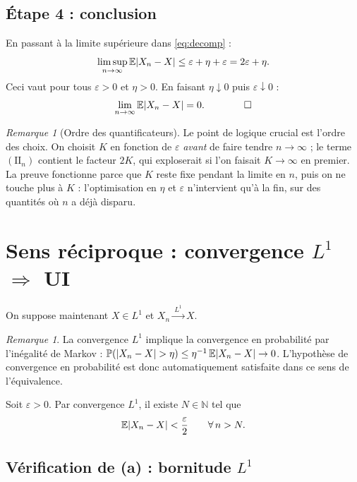 \documentclass[11pt,a4paper]{article}
\theoremstyle{definition}
\theoremstyle{remark}
\newtheorem{remark}[theorem]{Remarque}
\newcommand{\E}{\mathbb{E}}
\newcommand{\PP}{\mathbb{P}}
\newcommand{\N}{\mathbb{N}}
\newcommand{\convLone}{\xrightarrow{\ L^1\ }}
\DeclarePairedDelimiter{\abs}{\lvert}{\rvert}
\begin{document}
\subsection{Étape 4 : conclusion}

En passant à la limite supérieure dans \eqref{eq:decomp} :
\[
\limsup_{n \to \infty} \E\abs{X_n - X}
\le \varepsilon + \eta + \varepsilon
= 2\varepsilon + \eta.
\]
Ceci vaut pour tous $\varepsilon > 0$ et $\eta > 0$. En faisant
$\eta \downarrow 0$ puis $\varepsilon \downarrow 0$ :
\[
\lim_{n \to \infty} \E\abs{X_n - X} = 0. \qquad \qed
\]

\begin{remark}[Ordre des quantificateurs]
Le point de logique crucial est l'ordre des choix. On choisit $K$ en fonction de
$\varepsilon$ \emph{avant} de faire tendre $n \to \infty$ ; le terme
$(\mathrm{II}_n)$ contient le facteur $2K$, qui exploserait si l'on faisait
$K \to \infty$ en premier. La preuve fonctionne parce que $K$ reste fixe pendant
la limite en $n$, puis on ne touche plus à $K$ : l'optimisation en $\eta$ et
$\varepsilon$ n'intervient qu'à la fin, sur des quantités où $n$ a déjà disparu.
\end{remark}

\section{Sens réciproque : convergence $L^1$ $\Rightarrow$ UI}

On suppose maintenant $X \in L^1$ et $X_n \convLone X$.

\begin{remark}
La convergence $L^1$ implique la convergence en probabilité par l'inégalité de
Markov : $\PP(\abs{X_n - X} > \eta) \le \eta^{-1}\,\E\abs{X_n - X} \to 0$.
L'hypothèse de convergence en probabilité est donc automatiquement satisfaite
dans ce sens de l'équivalence.
\end{remark}

Soit $\varepsilon > 0$. Par convergence $L^1$, il existe $N \in \N$ tel que
\begin{equation}\label{eq:L1-N}
\E\abs{X_n - X} < \frac{\varepsilon}{2} \qquad \forall\, n > N.
\end{equation}

\subsection{Vérification de (a) : bornitude $L^1$}
\end{document}
